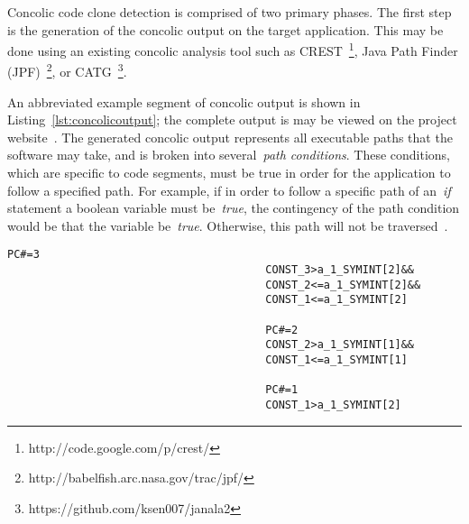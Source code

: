 \documentclass[smallextended]{svjour3}       %
\begin{document}
Concolic code clone detection is comprised of two primary phases. The first step is the generation of the concolic output on the target application. This may be done using an existing concolic analysis tool such as CREST~\footnote{http://code.google.com/p/crest/}, Java Path Finder (JPF)~\footnote{http://babelfish.arc.nasa.gov/trac/jpf/}, or CATG~\footnote{https://github.com/ksen007/janala2}.

An abbreviated example segment of concolic output is shown in Listing~\ref{lst:concolicoutput}; the complete output is may be viewed on the project website~\cite{cccd_url}. The generated concolic output represents all executable paths that the software may take, and is broken into several~\emph{path conditions}. These conditions, which are specific to code segments, must be true in order for the application to follow a specified path. For example, if in order to follow a specific path of an~\emph{if} statement a boolean variable must be~\emph{true}, the contingency of the path condition would be that the variable be~\emph{true}. Otherwise, this path will not be traversed~\cite{Sen:2005:CCU:1081706.1081750}.


\begin{minipage}{\linewidth}
\begin{lstlisting}[label=lst:concolicoutput, caption=Example Concolic Output]
										PC#=3
										CONST_3>a_1_SYMINT[2]&&
										CONST_2<=a_1_SYMINT[2]&&
										CONST_1<=a_1_SYMINT[2]

										PC#=2
										CONST_2>a_1_SYMINT[1]&&
										CONST_1<=a_1_SYMINT[1]

										PC#=1
										CONST_1>a_1_SYMINT[2]

\end{lstlisting}
\end{minipage}
\end{document}
